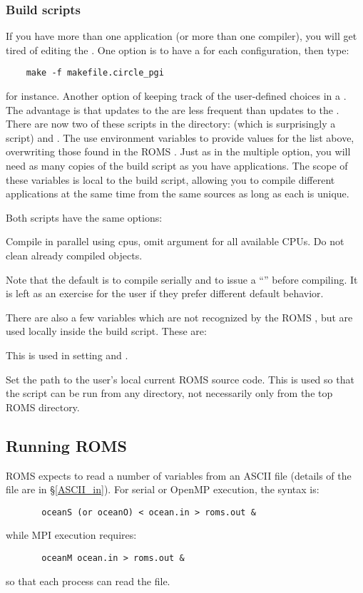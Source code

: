 \subsubsection{Build scripts}

If you have more than one application (or more than one compiler),
you will get tired of editing the .
One option is to have a  for each configuration, then
type:
\begin{verbatim}
    make -f makefile.circle_pgi
\end{verbatim}
for instance. Another option of keeping track of the user-defined
choices in a . The advantage is that updates
to the  are less frequent than updates to the
. There are now two of these scripts in the 
directory:  (which is surprisingly a  script)
and .  The  use environment variables
to provide values for the list above, overwriting those found in the ROMS
. Just as in the multiple  option, you will
need as many copies of the build script as you have applications. The
scope of these variables is local to the build script, allowing you to
compile different applications at the same time from the same sources
as long as each  is unique.

Both scripts have the same options:
\begin{klist}
   Compile in parallel using  cpus,
  omit argument for all available CPUs.
      Do not clean already compiled objects.
\end{klist}
Note that the default is to compile serially and to issue a
``'' before compiling. It is left as an exercise
for the user if they prefer different default behavior.

There are also a few variables which are not recognized by the ROMS
, but are used locally inside the build script. These
are:
\begin{klist}
 This is used in setting
 and .

 Set the path to the user's local current ROMS source
code. This is used so that the script can be run from any directory,
not necessarily only from the top ROMS directory.
\end{klist}

\subsection{Running ROMS}
\label{Running}
ROMS expects to read a number of variables from an ASCII file
(details of the file are in \S\ref{ASCII_in}).
For serial or OpenMP execution, the syntax is:
\begin{verbatim}
       oceanS (or oceanO) < ocean.in > roms.out &
\end{verbatim}
while MPI execution requires:
\begin{verbatim}
       oceanM ocean.in > roms.out &
\end{verbatim}
so that each process can read the file.

